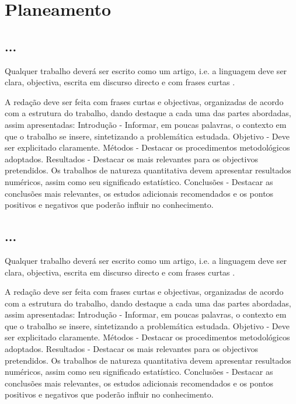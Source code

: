 % 
%  
%
\chapter{Planeamento}
\label{cha:WorkPlan}

\section{...}
Qualquer trabalho deverá ser escrito como um artigo, i.e. a linguagem deve ser clara, objectiva, escrita em discurso directo e com frases curtas \cite{gustavii2016write, glasman2010science}.

A redação deve ser feita com frases curtas e objectivas, organizadas de acordo com a estrutura do trabalho, dando destaque a cada uma das partes abordadas, assim apresentadas: Introdução - Informar, em poucas palavras, o contexto em que o trabalho se insere, sintetizando a problemática estudada. Objetivo - Deve ser explicitado claramente. Métodos - Destacar os procedimentos metodológicos adoptados. Resultados - Destacar os mais relevantes para os objectivos pretendidos. Os trabalhos de natureza quantitativa devem apresentar resultados numéricos, assim como seu significado estatístico. Conclusões - Destacar as conclusões mais relevantes, os estudos adicionais recomendados e os pontos positivos e negativos que poderão influir no conhecimento. 


\section{...}
Qualquer trabalho deverá ser escrito como um artigo, i.e. a linguagem deve ser clara, objectiva, escrita em discurso directo e com frases curtas \cite{gustavii2016write, glasman2010science}.

A redação deve ser feita com frases curtas e objectivas, organizadas de acordo com a estrutura do trabalho, dando destaque a cada uma das partes abordadas, assim apresentadas: Introdução - Informar, em poucas palavras, o contexto em que o trabalho se insere, sintetizando a problemática estudada. Objetivo - Deve ser explicitado claramente. Métodos - Destacar os procedimentos metodológicos adoptados. Resultados - Destacar os mais relevantes para os objectivos pretendidos. Os trabalhos de natureza quantitativa devem apresentar resultados numéricos, assim como seu significado estatístico. Conclusões - Destacar as conclusões mais relevantes, os estudos adicionais recomendados e os pontos positivos e negativos que poderão influir no conhecimento.

